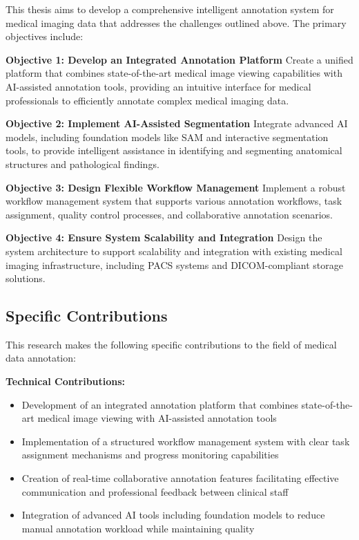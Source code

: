 This thesis aims to develop a comprehensive intelligent annotation system for medical imaging data that addresses the challenges outlined above. The primary objectives include:

\textbf{Objective 1: Develop an Integrated Annotation Platform}
Create a unified platform that combines state-of-the-art medical image viewing capabilities with AI-assisted annotation tools, providing an intuitive interface for medical professionals to efficiently annotate complex medical imaging data.

\textbf{Objective 2: Implement AI-Assisted Segmentation}
Integrate advanced AI models, including foundation models like SAM and interactive segmentation tools, to provide intelligent assistance in identifying and segmenting anatomical structures and pathological findings.

\textbf{Objective 3: Design Flexible Workflow Management}
Implement a robust workflow management system that supports various annotation workflows, task assignment, quality control processes, and collaborative annotation scenarios.

\textbf{Objective 4: Ensure System Scalability and Integration}
Design the system architecture to support scalability and integration with existing medical imaging infrastructure, including PACS systems and DICOM-compliant storage solutions.

\subsection{Specific Contributions}

This research makes the following specific contributions to the field of medical data annotation:

\textbf{Technical Contributions:}
\begin{itemize}
    \item Development of an integrated annotation platform that combines state-of-the-art medical image viewing with AI-assisted annotation tools
    \item Implementation of a structured workflow management system with clear task assignment mechanisms and progress monitoring capabilities
    \item Creation of real-time collaborative annotation features facilitating effective communication and professional feedback between clinical staff
    \item Integration of advanced AI tools including foundation models to reduce manual annotation workload while maintaining quality
\end{itemize}

